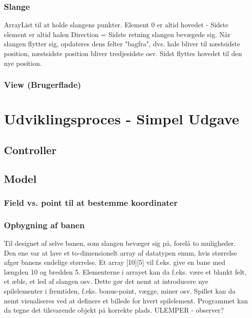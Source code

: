 \documentclass{report}
\begin{document}
\subsubsection{Slange}

	ArrayList til at holde slangens punkter.
	Element 0 er altid hovedet - Sidste element er altid halen
	Direction = Sidste retning slangen bevægede sig.
	Når slangen flytter sig, opdateres dens felter "bagfra", dvs. hale bliver til næstsidste 	position, næstsidste position bliver tredjesidste osv. Sidst flyttes hovedet til den nye 	position.
	
\subsubsection{View (Brugerflade)}
	
\section{Udviklingsproces - Simpel Udgave}
\subsection{Controller}
	
\subsection{Model}

\subsubsection{Field vs. point til at bestemme koordinater}

\subsubsection{Opbygning af banen}

Til designet af selve banen, som slangen bevæger sig på, forelå to muligheder. Den ene var at lave et to-dimensionelt array af datatypen enum, hvis størrelse afgør banens endelige størrelse. Et array [10][5] vil f.eks. give en bane med længden 10 og bredden 5. Elementerne i arrayet kan da f.eks. være et blankt felt, et æble, et led af slangen osv. Dette gør det nemt at introducere nye spilelementer i fremtiden, f.eks. bonus-point, vægge, miner osv. Spillet kan da nemt visualiseres ved at definere et billede for hvert spilelement. Programmet kan da tegne det tilsvarende objekt på korrekte plads.
ULEMPER - observer?
\end{document}
